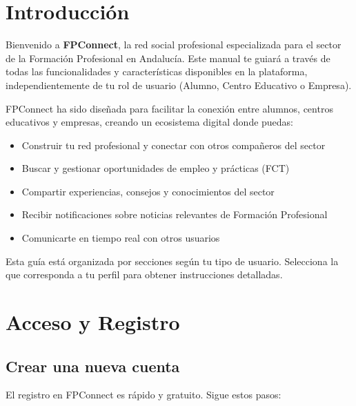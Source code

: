 \documentclass[a4paper]{report}
\begin{document}
\chapter*{Introducción}

Bienvenido a \textbf{FPConnect}, la red social profesional especializada para el sector de la Formación Profesional en Andalucía. Este manual te guiará a través de todas las funcionalidades y características disponibles en la plataforma, independientemente de tu rol de usuario (Alumno, Centro Educativo o Empresa).

FPConnect ha sido diseñada para facilitar la conexión entre alumnos, centros educativos y empresas, creando un ecosistema digital donde puedas:

\begin{itemize}
  \item Construir tu red profesional y conectar con otros compañeros del sector
  \item Buscar y gestionar oportunidades de empleo y prácticas (FCT)
  \item Compartir experiencias, consejos y conocimientos del sector
  \item Recibir notificaciones sobre noticias relevantes de Formación Profesional
  \item Comunicarte en tiempo real con otros usuarios
\end{itemize}

Esta guía está organizada por secciones según tu tipo de usuario. Selecciona la que corresponda a tu perfil para obtener instrucciones detalladas.

\newpage

\chapter{Acceso y Registro}

\section{Crear una nueva cuenta}

El registro en FPConnect es rápido y gratuito. Sigue estos pasos:
\end{document}
